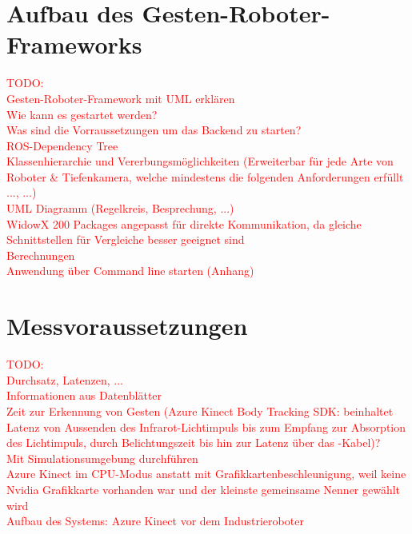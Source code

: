 
\section{Aufbau des Gesten-Roboter-Frameworks}
\textcolor{red}{TODO:\\
Gesten-Roboter-Framework mit UML erklären\\
Wie kann es gestartet werden?\\
Was sind die Vorraussetzungen um das Backend zu starten?\\
ROS-Dependency Tree\\
Klassenhierarchie und Vererbungsmöglichkeiten (Erweiterbar für jede Arte von Roboter \& Tiefenkamera, welche mindestens die folgenden Anforderungen erfüllt ..., ...)\\
UML Diagramm (Regelkreis, Besprechung, ...)\\
WidowX 200 Packages angepasst für direkte Kommunikation, da gleiche Schnittstellen für Vergleiche besser geeignet sind\\
Berechnungen\\
Anwendung über Command line starten (Anhang)
}

\section{Messvoraussetzungen}
\textcolor{red}{TODO:\\
Durchsatz, Latenzen, ...\\
Informationen aus Datenblätter\\
Zeit zur Erkennung von Gesten (Azure Kinect Body Tracking SDK: beinhaltet Latenz von Aussenden des Infrarot-Lichtimpuls bis zum Empfang zur Absorption des Lichtimpuls, durch Belichtungszeit bis hin zur Latenz über das -Kabel)?\\
Mit Simulationsumgebung durchführen\\
Azure Kinect im CPU-Modus anstatt mit Grafikkartenbeschleunigung, weil keine Nvidia Grafikkarte vorhanden war und der kleinste gemeinsame Nenner gewählt wird\\
Aufbau des Systems: Azure Kinect vor dem Industrieroboter
}
